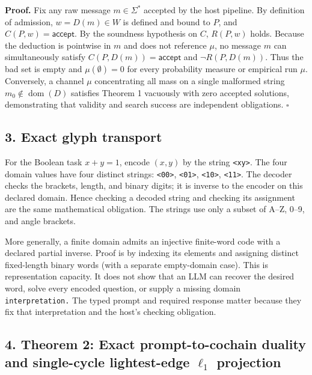 \documentclass[
  11pt,
]{article}
\newcommand{\passthrough}[1]{#1}
\begin{document}
\textbf{Proof.} Fix any raw message \(m \in \Sigma^*\) accepted by the
host pipeline. By definition of admission, \(w = D(m) \in W\) is defined
and bound to \(P\), and \(C(P,\allowbreak  w) = \mathsf{accept}\). By
the soundness hypothesis on \(C\), \(R(P,\allowbreak  w)\) holds.
Because the deduction is pointwise in \(m\) and does not reference
\(\mu\), no message \(m\) can simultaneously satisfy
\(C(P,\allowbreak  D(m)) = \mathsf{accept}\) and
\(\neg R(P,\allowbreak  D(m))\). Thus the bad set is empty and
\(\mu(\emptyset) = 0\) for every probability measure or empirical run
\(\mu\). Conversely, a channel \(\mu\) concentrating all mass on a
single malformed string \(m_0 \notin \operatorname{dom}(D)\) satisfies
Theorem 1 vacuously with zero accepted solutions, demonstrating that
validity and search success are independent obligations. \(\square\)

\subsection{3. Exact glyph transport}\label{exact-glyph-transport}

For the Boolean task \(x+y=1\), encode \((x,\allowbreak y)\) by the
string \passthrough{\lstinline!<xy>!}. The four domain values have four
distinct strings: \passthrough{\lstinline!<00>!},
\passthrough{\lstinline!<01>!}, \passthrough{\lstinline!<10>!},
\passthrough{\lstinline!<11>!}. The decoder checks the brackets, length,
and binary digits; it is inverse to the encoder on this declared domain.
Hence checking a decoded string and checking its assignment are the same
mathematical obligation. The strings use only a subset of A--Z, 0--9,
and angle brackets.

More generally, a finite domain admits an injective finite-word code
with a declared partial inverse. Proof is by indexing its elements and
assigning distinct fixed-length binary words (with a separate
empty-domain case). This is representation capacity. It does not show
that an LLM can recover the desired word, solve every encoded question,
or supply a missing domain \nolinkurl{interpretation.} The typed prompt
and required response matter because they fix that interpretation and
the host's checking obligation.

\subsection{\texorpdfstring{4. Theorem 2: Exact prompt-to-cochain
duality and single-cycle lightest-edge \(\ell_1\)
projection}{4. Theorem 2: Exact prompt-to-cochain duality and single-cycle lightest-edge \textbackslash ell\_1 projection}}\label{theorem-2-exact-prompt-to-cochain-duality-and-single-cycle-lightest-edge-ell_1-projection}
\end{document}
